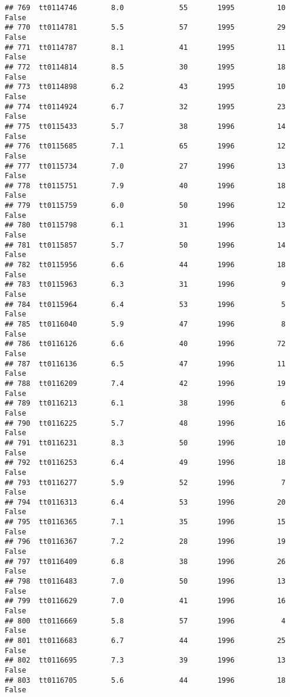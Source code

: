 \documentclass[
]{article}
\begin{document}
\begin{verbatim}
## 769  tt0114746        8.0             55       1995          10   False
## 770  tt0114781        5.5             57       1995          29   False
## 771  tt0114787        8.1             41       1995          11   False
## 772  tt0114814        8.5             30       1995          18   False
## 773  tt0114898        6.2             43       1995          10   False
## 774  tt0114924        6.7             32       1995          23   False
## 775  tt0115433        5.7             38       1996          14   False
## 776  tt0115685        7.1             65       1996          12   False
## 777  tt0115734        7.0             27       1996          13   False
## 778  tt0115751        7.9             40       1996          18   False
## 779  tt0115759        6.0             50       1996          12   False
## 780  tt0115798        6.1             31       1996          13   False
## 781  tt0115857        5.7             50       1996          14   False
## 782  tt0115956        6.6             44       1996          18   False
## 783  tt0115963        6.3             31       1996           9   False
## 784  tt0115964        6.4             53       1996           5   False
## 785  tt0116040        5.9             47       1996           8   False
## 786  tt0116126        6.6             40       1996          72   False
## 787  tt0116136        6.5             47       1996          11   False
## 788  tt0116209        7.4             42       1996          19   False
## 789  tt0116213        6.1             38       1996           6   False
## 790  tt0116225        5.7             48       1996          16   False
## 791  tt0116231        8.3             50       1996          10   False
## 792  tt0116253        6.4             49       1996          18   False
## 793  tt0116277        5.9             52       1996           7   False
## 794  tt0116313        6.4             53       1996          20   False
## 795  tt0116365        7.1             35       1996          15   False
## 796  tt0116367        7.2             28       1996          19   False
## 797  tt0116409        6.8             38       1996          26   False
## 798  tt0116483        7.0             50       1996          13   False
## 799  tt0116629        7.0             41       1996          16   False
## 800  tt0116669        5.8             57       1996           4   False
## 801  tt0116683        6.7             44       1996          25   False
## 802  tt0116695        7.3             39       1996          13   False
## 803  tt0116705        5.6             44       1996          18   False

\end{verbatim}
\end{document}
